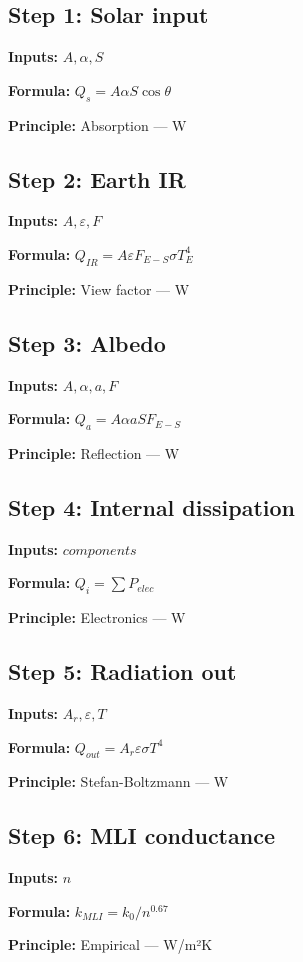 \documentclass[11pt,twocolumn]{article}
\begin{document}
\subsection*{Step 1: Solar input}
\textbf{Inputs:} $A, \alpha, S$

\textbf{Formula:} $Q_s = A \alpha S \cos\theta$

\textbf{Principle:} Absorption --- W

\subsection*{Step 2: Earth IR}
\textbf{Inputs:} $A, \varepsilon, F$

\textbf{Formula:} $Q_{IR} = A \varepsilon F_{E-S} \sigma T_E^4$

\textbf{Principle:} View factor --- W

\subsection*{Step 3: Albedo}
\textbf{Inputs:} $A, \alpha, a, F$

\textbf{Formula:} $Q_a = A \alpha a S F_{E-S}$

\textbf{Principle:} Reflection --- W

\subsection*{Step 4: Internal dissipation}
\textbf{Inputs:} $components$

\textbf{Formula:} $Q_i = \sum P_{elec}$

\textbf{Principle:} Electronics --- W

\subsection*{Step 5: Radiation out}
\textbf{Inputs:} $A_r, \varepsilon, T$

\textbf{Formula:} $Q_{out} = A_r \varepsilon \sigma T^4$

\textbf{Principle:} Stefan-Boltzmann --- W

\subsection*{Step 6: MLI conductance}
\textbf{Inputs:} $n$

\textbf{Formula:} $k_{MLI} = k_0 / n^{0.67}$

\textbf{Principle:} Empirical --- W/m²K
\end{document}
